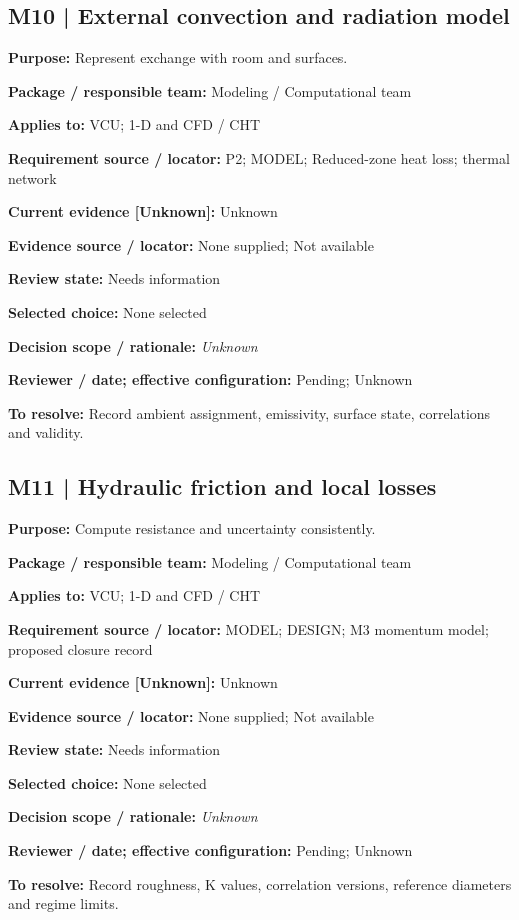 \documentclass[11pt]{article}
\begin{document}
\par\noindent\begin{minipage}{\textwidth}\small\setlength{\parskip}{2pt}
\subsection*{M10 | External convection and radiation model}
\textbf{Purpose:} Represent exchange with room and surfaces.\par
\textbf{Package / responsible team:} Modeling / Computational team\par
\textbf{Applies to:} VCU; 1-D and CFD / CHT\par
\textbf{Requirement source / locator:} P2; MODEL; Reduced-zone heat loss; thermal network\par
\textbf{Current evidence [Unknown]:} Unknown\par
\textbf{Evidence source / locator:} None supplied; Not available\par
\textbf{Review state:} Needs information\par
\textbf{Selected choice:} None selected\par
\textbf{Decision scope / rationale:} \textit{Unknown}\par
\textbf{Reviewer / date; effective configuration:} Pending; Unknown\par
\textbf{To resolve:} Record ambient assignment, emissivity, surface state, correlations and validity.\par
\end{minipage}\par\vspace{5pt}
\par\noindent\begin{minipage}{\textwidth}\small\setlength{\parskip}{2pt}
\subsection*{M11 | Hydraulic friction and local losses}
\textbf{Purpose:} Compute resistance and uncertainty consistently.\par
\textbf{Package / responsible team:} Modeling / Computational team\par
\textbf{Applies to:} VCU; 1-D and CFD / CHT\par
\textbf{Requirement source / locator:} MODEL; DESIGN; M3 momentum model; proposed closure record\par
\textbf{Current evidence [Unknown]:} Unknown\par
\textbf{Evidence source / locator:} None supplied; Not available\par
\textbf{Review state:} Needs information\par
\textbf{Selected choice:} None selected\par
\textbf{Decision scope / rationale:} \textit{Unknown}\par
\textbf{Reviewer / date; effective configuration:} Pending; Unknown\par
\textbf{To resolve:} Record roughness, K values, correlation versions, reference diameters and regime limits.\par
\end{minipage}\par\vspace{5pt}
\end{document}
